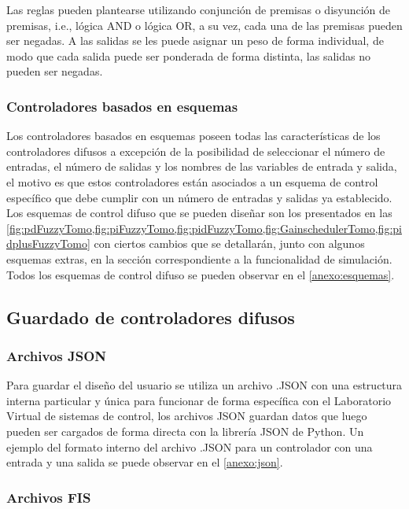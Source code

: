                 Las reglas pueden plantearse utilizando conjunción de premisas o disyunción de premisas, i.e., lógica AND o lógica OR, a su vez, cada una de las premisas pueden ser negadas. A las salidas se les puede asignar un peso de forma individual, de modo que cada salida puede ser ponderada de forma distinta, las salidas no pueden ser negadas.

        \subsubsection{Controladores basados en esquemas}

            Los controladores basados en esquemas poseen todas las características de los controladores difusos a excepción de la posibilidad de seleccionar el número de entradas, el número de salidas y los nombres de las variables de entrada y salida, el motivo es que estos controladores están asociados a un esquema de control específico que debe cumplir con un número de entradas y salidas ya establecido. Los esquemas de control difuso que se pueden diseñar son los presentados en las \cref{fig:pdFuzzyTomo,fig:piFuzzyTomo,fig:pidFuzzyTomo,fig:GainschedulerTomo,fig:pidplusFuzzyTomo} con ciertos cambios que se detallarán, junto con algunos esquemas extras, en la sección correspondiente a la funcionalidad de simulación. Todos los esquemas de control difuso se pueden observar en el \ref{anexo:esquemas}.

    \subsection{Guardado de controladores difusos}

        \subsubsection{Archivos JSON}
        
            Para guardar el diseño del usuario se utiliza un archivo .JSON con una estructura interna particular y única para funcionar de forma específica con el Laboratorio Virtual de sistemas de control, los archivos JSON guardan datos que luego pueden ser cargados de forma directa con la librería JSON de Python. Un ejemplo del formato interno del archivo .JSON para un controlador con una entrada y una salida se puede observar en el \ref{anexo:json}.

        \subsubsection{Archivos FIS}

